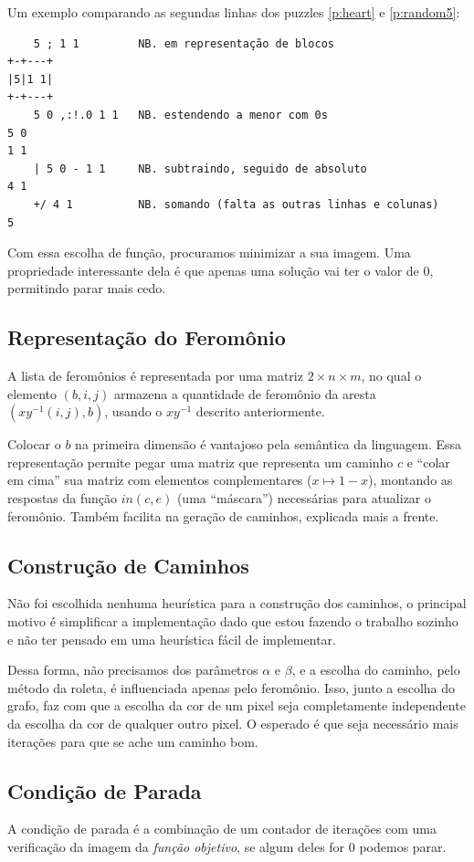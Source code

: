 \documentclass{article}
\begin{document}
Um exemplo comparando as segundas linhas dos
puzzles \ref{p:heart} e \ref{p:random5}:
\begin{verbatim}
    5 ; 1 1         NB. em representação de blocos
+-+---+
|5|1 1|
+-+---+
    5 0 ,:!.0 1 1   NB. estendendo a menor com 0s
5 0
1 1
    | 5 0 - 1 1     NB. subtraindo, seguido de absoluto
4 1
    +/ 4 1          NB. somando (falta as outras linhas e colunas)
5
\end{verbatim}

Com essa escolha de função,
procuramos minimizar a sua imagem.
Uma propriedade interessante dela é
que apenas uma solução vai ter o valor de \(0\),
permitindo parar mais cedo.

\subsection{Representação do Feromônio}
A lista de feromônios é representada por uma
matriz \(2 \times n \times m\),
no qual o elemento \((b, i, j)\) armazena a
quantidade de feromônio da aresta \((xy^{-1}(i, j), b)\),
usando o \(xy^{-1}\) descrito anteriormente.

Colocar o \(b\) na primeira dimensão
é vantajoso pela semântica da linguagem.
Essa representação permite pegar
uma matriz que representa um caminho \(c\)
e ``colar em cima'' sua matriz com elementos complementares
(\(x \longmapsto 1 - x\)),
montando as respostas da função \(in(c, e)\)
(uma ``máscara'')
necessárias para atualizar o feromônio.
Também facilita na geração de caminhos,
explicada mais a frente.

\subsection{Construção de Caminhos}
Não foi escolhida nenhuma heurística
para a construção dos caminhos,
o principal motivo é simplificar a implementação
dado que estou fazendo o trabalho sozinho e
não ter pensado em uma heurística fácil de implementar.

Dessa forma, não precisamos
dos parâmetros \(\alpha\) e \(\beta\),
e a escolha do caminho,
pelo método da roleta,
é influenciada apenas pelo feromônio.
Isso, junto a escolha do grafo,
faz com que a escolha da cor de um pixel
seja completamente independente
da escolha da cor de qualquer outro pixel.
O esperado é que seja necessário mais iterações
para que se ache um caminho bom.

\subsection{Condição de Parada}
A condição de parada é a combinação
de um contador de iterações
com uma verificação da imagem da \emph{função objetivo},
se algum deles for \(0\) podemos parar.
\end{document}

